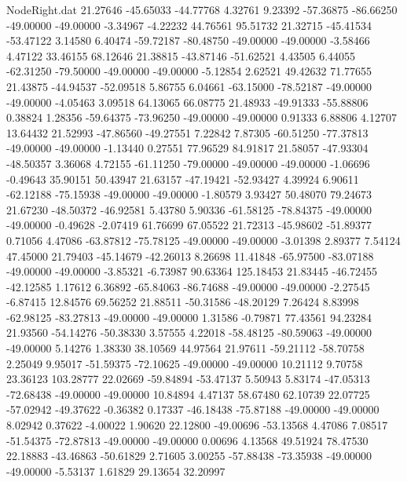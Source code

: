 \begin{filecontents}{NodeRight.dat}
  21.27646  -45.65033  -44.77768     4.32761    9.23392  -57.36875  -86.66250  -49.00000  -49.00000   -3.34967   -4.22232   44.76561   95.51732
  21.32715  -45.41534  -53.47122     3.14580    6.40474  -59.72187  -80.48750  -49.00000  -49.00000   -3.58466    4.47122   33.46155   68.12646
  21.38815  -43.87146  -51.62521     4.43505    6.44055  -62.31250  -79.50000  -49.00000  -49.00000   -5.12854    2.62521   49.42632   71.77655
  21.43875  -44.94537  -52.09518     5.86755    6.04661  -63.15000  -78.52187  -49.00000  -49.00000   -4.05463    3.09518   64.13065   66.08775
  21.48933  -49.91333  -55.88806     0.38824    1.28356  -59.64375  -73.96250  -49.00000  -49.00000    0.91333    6.88806    4.12707   13.64432
  21.52993  -47.86560  -49.27551     7.22842    7.87305  -60.51250  -77.37813  -49.00000  -49.00000   -1.13440    0.27551   77.96529   84.91817
  21.58057  -47.93304  -48.50357     3.36068    4.72155  -61.11250  -79.00000  -49.00000  -49.00000   -1.06696   -0.49643   35.90151   50.43947
  21.63157  -47.19421  -52.93427     4.39924    6.90611  -62.12188  -75.15938  -49.00000  -49.00000   -1.80579    3.93427   50.48070   79.24673
  21.67230  -48.50372  -46.92581     5.43780    5.90336  -61.58125  -78.84375  -49.00000  -49.00000   -0.49628   -2.07419   61.76699   67.05522
  21.72313  -45.98602  -51.89377     0.71056    4.47086  -63.87812  -75.78125  -49.00000  -49.00000   -3.01398    2.89377    7.54124   47.45000
  21.79403  -45.14679  -42.26013     8.26698   11.41848  -65.97500  -83.07188  -49.00000  -49.00000   -3.85321   -6.73987   90.63364  125.18453
  21.83445  -46.72455  -42.12585     1.17612    6.36892  -65.84063  -86.74688  -49.00000  -49.00000   -2.27545   -6.87415   12.84576   69.56252
  21.88511  -50.31586  -48.20129     7.26424    8.83998  -62.98125  -83.27813  -49.00000  -49.00000    1.31586   -0.79871   77.43561   94.23284
  21.93560  -54.14276  -50.38330     3.57555    4.22018  -58.48125  -80.59063  -49.00000  -49.00000    5.14276    1.38330   38.10569   44.97564
  21.97611  -59.21112  -58.70758     2.25049    9.95017  -51.59375  -72.10625  -49.00000  -49.00000   10.21112    9.70758   23.36123  103.28777
  22.02669  -59.84894  -53.47137     5.50943    5.83174  -47.05313  -72.68438  -49.00000  -49.00000   10.84894    4.47137   58.67480   62.10739
  22.07725  -57.02942  -49.37622    -0.36382    0.17337  -46.18438  -75.87188  -49.00000  -49.00000    8.02942    0.37622   -4.00022    1.90620
  22.12800  -49.00696  -53.13568     4.47086    7.08517  -51.54375  -72.87813  -49.00000  -49.00000    0.00696    4.13568   49.51924   78.47530
  22.18883  -43.46863  -50.61829     2.71605    3.00255  -57.88438  -73.35938  -49.00000  -49.00000   -5.53137    1.61829   29.13654   32.20997

\end{filecontents}
